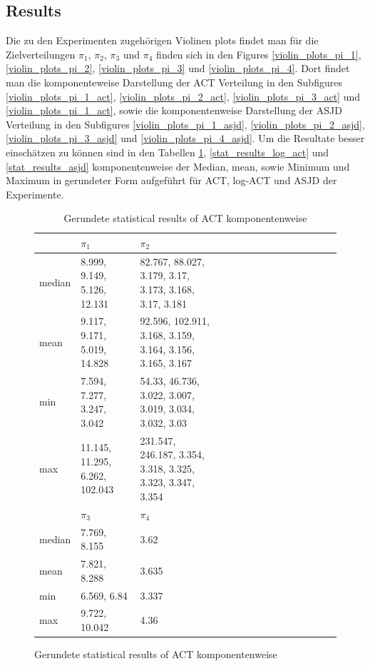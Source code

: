 \documentclass{scrartcl}
\begin{document}
    \subsection{Results}
    Die zu den Experimenten zugehörigen Violinen plots findet man für die Zielverteilungen $\pi_1$, $\pi_2$, $\pi_3$ und $\pi_4$ finden sich
    in den Figures \ref{violin_plots_pi_1}, \ref{violin_plots_pi_2}, \ref{violin_plots_pi_3} und \ref{violin_plots_pi_4}. Dort findet man
    die komponenteweise Darstellung der ACT Verteilung in den Subfigures \ref{violin_plots_pi_1_act}, \ref{violin_plots_pi_2_act}, \ref{violin_plots_pi_3_act} und \ref{violin_plots_pi_1_act}, sowie
    die komponentenweise Darstellung der ASJD Verteilung in den Subfigures \ref{violin_plots_pi_1_asjd}, \ref{violin_plots_pi_2_asjd}, \ref{violin_plots_pi_3_asjd} und \ref{violin_plots_pi_4_asjd}.
    Um die Resultate besser einschätzen zu können sind in den Tabellen \ref{stat_results_act}, \ref{stat_results_log_act} und \ref{stat_results_asjd} komponentenweise der Median, mean, sowie Minimum und Maximum in gerundeter Form
    aufgeführt für ACT, log-ACT und ASJD der Experimente.

    \begin{figure}[H]
        \begin{table}[H]
            \centering
            \begin{tabular}{|l|l|l|l|l|l|l|l|l|l|l|l|l|l|l|}
                \hline & $\pi_1$ & $\pi_2$ \\ \hline
                median & 8.999, 9.149, 5.126, 12.131 & 82.767, 88.027, 3.179, 3.17, 3.173, 3.168, 3.17, 3.181 \\\hline
                mean & 9.117, 9.171, 5.019, 14.828 & 92.596, 102.911, 3.168, 3.159, 3.164, 3.156, 3.165, 3.167 \\\hline
                min & 7.594, 7.277, 3.247, 3.042 & 54.33, 46.736, 3.022, 3.007, 3.019, 3.034, 3.032, 3.03 \\\hline
                max & 11.145, 11.295, 6.262, 102.043 & 231.547, 246.187, 3.354, 3.318, 3.325, 3.323, 3.347, 3.354 \\\hline
                \hline & $\pi_3$ & $\pi_4$ \\ \hline
                median & 7.769, 8.155 & 3.62 \\\hline
                mean & 7.821, 8.288 & 3.635 \\\hline
                min & 6.569, 6.84 & 3.337 \\\hline
                max & 9.722, 10.042 & 4.36 \\\hline
            \end{tabular}
            \caption{Gerundete statistical results of ACT komponentenweise}
            \label{stat_results_act}
        \end{table}
    \end{figure}
\end{document}
